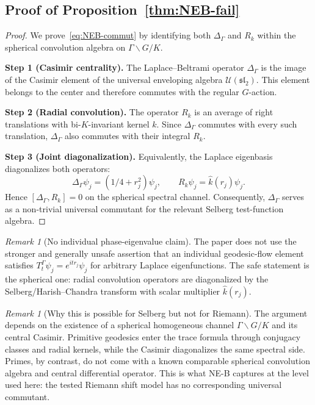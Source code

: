 \documentclass[12pt,a4paper]{article}
\theoremstyle{definition}
\theoremstyle{remark}
\newtheorem{remark}[theorem]{Remark}
\newcommand{\Delop}{\Delta_{\Gamma}}
\begin{document}
\subsection{\texorpdfstring{Proof of Proposition~\ref{thm:NEB-fail}}{Proof of Proposition 5.1}}

\begin{proof}
We prove~\eqref{eq:NEB-commut} by identifying both $\Delop$ and $R_k$ within the spherical convolution algebra on $\Gamma\backslash G/K$.

\smallskip\noindent
\textbf{Step 1 (Casimir centrality).} The Laplace--Beltrami operator $\Delop$ is the image of the Casimir element of the universal enveloping algebra $\mathcal{U}(\mathfrak{sl}_2)$. This element belongs to the center and therefore commutes with the regular $G$-action.

\smallskip\noindent
\textbf{Step 2 (Radial convolution).} The operator $R_k$ is an average of right translations with bi-$K$-invariant kernel $k$. Since $\Delop$ commutes with every such translation, $\Delop$ also commutes with their integral $R_k$.

\smallskip\noindent
\textbf{Step 3 (Joint diagonalization).} Equivalently, the Laplace eigenbasis diagonalizes both operators:
\[
\Delop\psi_j = (1/4+r_j^2)\psi_j, \qquad R_k\psi_j = \hat{k}(r_j)\psi_j.
\]
Hence $[\Delop, R_k] = 0$ on the spherical spectral channel. Consequently, $\Delop$ serves as a non-trivial universal commutant for the relevant Selberg test-function algebra.
\end{proof}

\begin{remark}[No individual phase-eigenvalue claim]
The paper does not use the stronger and generally unsafe assertion that an
individual geodesic-flow element satisfies
$T^\Gamma_t\psi_j=e^{itr_j}\psi_j$ for arbitrary Laplace eigenfunctions.
The safe statement is the spherical one: radial convolution operators are
diagonalized by the Selberg/Harish--Chandra transform with scalar multiplier
$\hat{k}(r_j)$.
\end{remark}

\begin{remark}[Why this is possible for Selberg but not for Riemann]
The argument depends on the existence of a spherical homogeneous channel
$\Gamma\backslash G/K$ and its central Casimir.  Primitive geodesics enter the
trace formula through conjugacy classes and radial kernels, while the Casimir
diagonalizes the same spectral side.  Primes, by contrast, do not come with a
known comparable spherical convolution algebra and central differential
operator.  This is what NE-B captures at the level used here: the tested
Riemann shift model has no corresponding universal commutant.
\end{remark}
\end{document}
